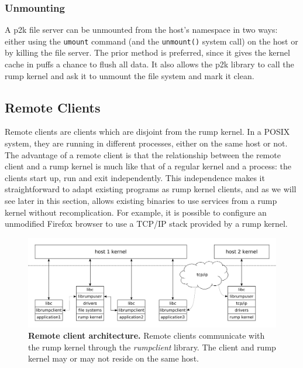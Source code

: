 \subsubsection{Unmounting}

A p2k file server can be unmounted from the host's namespace in
two ways: either using the \texttt{umount} command (and the
\texttt{unmount()} system call) on the host or by killing the file
server.  The prior method is preferred, since it gives the kernel
cache in puffs a chance to flush all data.  It also allows the p2k
library to call the rump kernel and ask it to unmount the file
system and mark it clean.

\subsection{Remote Clients}
\label{sect:sysproxyimpl}

Remote clients are clients which are disjoint from the rump kernel.
In a POSIX system, they are running in different
processes, either on the same host or not.  The advantage of a
remote client is that the relationship between the remote client
and a rump kernel is much like that of a regular kernel and a
process: the clients start up, run and exit independently.
This independence makes it straightforward to adapt existing
programs as rump kernel clients, and as we will see later in this section,
allows existing binaries to use services from a rump kernel without
recomplication.  For example, it is possible to configure an unmodified
Firefox browser to use a TCP/IP stack provided by a rump kernel.

\begin{figure}[t]
\includegraphics[width=\linewidth]{sysproxy}
\caption[Remote client architecture]{
\textbf{Remote client architecture.}
Remote clients communicate with the rump kernel through the
\textit{rumpclient} library.  The client and rump kernel may or
may not reside on the same host.
}
\label{fig:sysproxy}
\end{figure}

